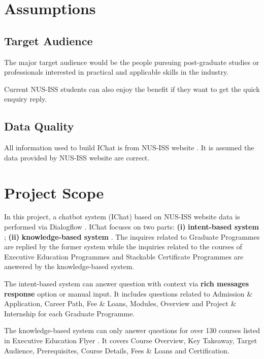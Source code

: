\section{Assumptions} %
\label{sec:assumptions}

	\subsection{Target Audience} %
	\label{sub:target_audience}
	The major target audience would be the people pursuing post-graduate studies or professionals interested in practical and applicable skills in the industry.

	Current NUS-ISS students can also enjoy the benefit if they want to get the quick enquiry reply.

	\subsection{Data Quality} %
	\label{sub:data_quality}
	All information used to build IChat is from NUS-ISS website \cite{nusiss}. It is assumed the data provided by NUS-ISS website are correct.


\section{Project Scope} %
\label{sec:project_scope}
	In this project, a chatbot system (IChat) based on NUS-ISS website data is performed via Dialogflow \cite{dialogflow}. IChat focuses on two parts: \textbf{(i)} \textbf{intent-based system} \cite{intentsoverview}; \textbf{(ii)} \textbf{knowledge-based system} \cite{knowledgeconnector}. The inquires related to Graduate Programmes are replied by the former system while the inquiries related to the courses of Executive Education Programmes and Stackable Certificate Programmes are answered by the knowledge-based system.

	The intent-based system can answer question with context \cite{context} via \textbf{rich messages response} \cite{richmessage} option or manual input. It includes questions related to Admission \& Application, Career Path, Fee \& Loans, Modules, Overview and Project \& Internship for each Graduate Programme.

	The knowledge-based system can only answer questions for over 130 courses listed in Executive Education Flyer \cite{course}. It covers Course Overview, Key Takeaway, Target Audience, Prerequisites, Course Details, Fees \& Loans and Certification.

